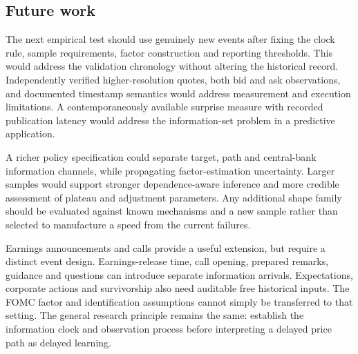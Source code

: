 \subsection{Future work}
The next empirical test should use genuinely new events after fixing the clock rule, sample requirements, factor construction and reporting thresholds. This would address the validation chronology without altering the historical record. Independently verified higher-resolution quotes, both bid and ask observations, and documented timestamp semantics would address measurement and execution limitations. A contemporaneously available surprise measure with recorded publication latency would address the information-set problem in a predictive application.

A richer policy specification could separate target, path and central-bank information channels, while propagating factor-estimation uncertainty. Larger samples would support stronger dependence-aware inference and more credible assessment of plateau and adjustment parameters. Any additional shape family should be evaluated against known mechanisms and a new sample rather than selected to manufacture a speed from the current failures.

Earnings announcements and calls provide a useful extension, but require a distinct event design. Earnings-release time, call opening, prepared remarks, guidance and questions can introduce separate information arrivals. Expectations, corporate actions and survivorship also need auditable free historical inputs. The FOMC factor and identification assumptions cannot simply be transferred to that setting. The general research principle remains the same: establish the information clock and observation process before interpreting a delayed price path as delayed learning.
